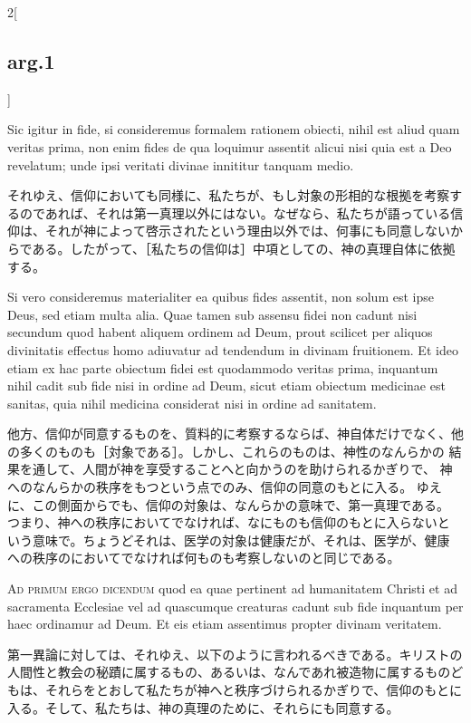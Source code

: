 \documentclass[paper=a4paper,fontsize=10pt,jafontsize=9pt,titlepage]{jlreq}
\begin{document}
\begin{paracol}{2}[\subsection{arg.1}]
\switchcolumn*

Sic igitur in fide, si consideremus formalem rationem
obiecti, nihil est aliud quam veritas prima, non enim fides de qua
loquimur assentit alicui nisi quia est a Deo revelatum; unde ipsi
veritati divinae innititur tanquam medio.

\switchcolumn

それゆえ、信仰においても同様に、私たちが、もし対象の形相的な根拠を考察す
るのであれば、それは第一真理以外にはない。なぜなら、私たちが語っている信
仰は、それが神によって啓示されたという理由以外では、何事にも同意しないか
らである。したがって、［私たちの信仰は］中項としての、神の真理自体に依拠
する。

\switchcolumn*

Si vero consideremus
materialiter ea quibus fides assentit, non solum est ipse Deus, sed
etiam multa alia. Quae tamen sub assensu fidei non cadunt nisi secundum
quod habent aliquem ordinem ad Deum, prout scilicet per aliquos
divinitatis effectus homo adiuvatur ad tendendum in divinam
fruitionem. Et ideo etiam ex hac parte obiectum fidei est quodammodo
veritas prima, inquantum nihil cadit sub fide nisi in ordine ad Deum,
sicut etiam obiectum medicinae est sanitas, quia nihil medicina
considerat nisi in ordine ad sanitatem.

\switchcolumn

他方、信仰が同意するものを、質料的に考察するならば、神自体だけでなく、他
 の多くのものも［対象である］。しかし、これらのものは、神性のなんらかの
 結果を通して、人間が神を享受することへと向かうのを助けられるかぎりで、
 神へのなんらかの秩序をもつという点でのみ、信仰の同意のもとに入る。
ゆえに、この側面からでも、信仰の対象は、なんらかの意味で、第一真理である。
 つまり、神への秩序においてでなければ、なにものも信仰のもとに入らないと
 いう意味で。ちょうどそれは、医学の対象は健康だが、それは、医学が、健康
 への秩序のにおいてでなければ何ものも考察しないのと同じである。

\switchcolumn*[\subsection{ad.1}]

{\scshape Ad primum ergo dicendum} quod ea quae
pertinent ad humanitatem Christi et ad sacramenta Ecclesiae vel ad
quascumque creaturas cadunt sub fide inquantum per haec ordinamur ad
Deum. Et eis etiam assentimus propter divinam veritatem.

\switchcolumn

第一異論に対しては、それゆえ、以下のように言われるべきである。キリストの
人間性と教会の秘蹟に属するもの、あるいは、なんであれ被造物に属するものど
もは、それらをとおして私たちが神へと秩序づけられるかぎりで、信仰のもとに
入る。そして、私たちは、神の真理のために、それらにも同意する。


\end{paracol}
\end{document}
